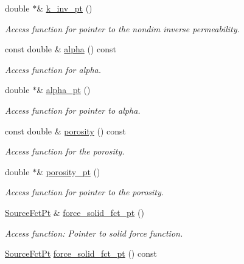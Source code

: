 \begin{DoxyCompactItemize}
double $\ast$\& \hyperlink{classoomph_1_1PoroelasticityEquations_a505c5b6b28d5e9f644533491a3231ffb}{k\+\_\+inv\+\_\+pt} ()
\begin{DoxyCompactList}\small\item\em Access function for pointer to the nondim inverse permeability. \end{DoxyCompactList}\item 
const double \& \hyperlink{classoomph_1_1PoroelasticityEquations_a3f9dc2e08ec6df6ac5b7e57713cad5ec}{alpha} () const
\begin{DoxyCompactList}\small\item\em Access function for alpha. \end{DoxyCompactList}\item 
double $\ast$\& \hyperlink{classoomph_1_1PoroelasticityEquations_a89814dc03d315008e96f026dd66524bf}{alpha\+\_\+pt} ()
\begin{DoxyCompactList}\small\item\em Access function for pointer to alpha. \end{DoxyCompactList}\item 
const double \& \hyperlink{classoomph_1_1PoroelasticityEquations_a09ec2c09c5c41a732523ccb9f8869fa0}{porosity} () const
\begin{DoxyCompactList}\small\item\em Access function for the porosity. \end{DoxyCompactList}\item 
double $\ast$\& \hyperlink{classoomph_1_1PoroelasticityEquations_aff9d4a78384f1f0d7ebb8f14a2b12a27}{porosity\+\_\+pt} ()
\begin{DoxyCompactList}\small\item\em Access function for pointer to the porosity. \end{DoxyCompactList}\item 
\hyperlink{classoomph_1_1PoroelasticityEquations_a234bc29fbd4c3255ef903a3cb5f6361f}{Source\+Fct\+Pt} \& \hyperlink{classoomph_1_1PoroelasticityEquations_ae59c6343b07892f04c9005bdebd9a222}{force\+\_\+solid\+\_\+fct\+\_\+pt} ()
\begin{DoxyCompactList}\small\item\em Access function\+: Pointer to solid force function. \end{DoxyCompactList}\item 
\hyperlink{classoomph_1_1PoroelasticityEquations_a234bc29fbd4c3255ef903a3cb5f6361f}{Source\+Fct\+Pt} \hyperlink{classoomph_1_1PoroelasticityEquations_ae86831a8828e73c666585ac2dcf56456}{force\+\_\+solid\+\_\+fct\+\_\+pt} () const

\end{DoxyCompactItemize}
